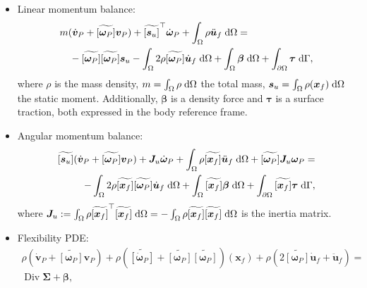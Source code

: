 \documentclass{svjour3}                     %
\DeclareMathOperator*{\Div}{Div}
\newcommand{\crmat}[1]{\ensuremath{\widetilde{\left[#1\right]}}}
\begin{document}
\begin{itemize}
	\item Linear momentum balance:
	\begin{equation}
	\label{eq:rig_tr1}
	\begin{split}
	&m (\dot{\bm{v}}_P + \crmat{\bm{\omega}_P} \bm{v}_P) + \crmat{\bm{s}_u}^\top \dot{\bm{\omega}}_P  + \int_{\Omega} \rho \ddot{\bm{u}}_f \d{\Omega} = \\
	&\quad - \crmat{\bm{\omega}_P} \crmat{\bm{\omega}_P} \bm{s}_u - \int_{\Omega} 2 \rho \crmat{\bm{\omega}_P} \dot{\bm{u}}_f \d{\Omega} +  \int_{\Omega} \bm\beta \d{\Omega} + \int_{\partial \Omega} \bm\tau \d{\Gamma},
	\end{split}
	\end{equation}
	where $\rho$ is the mass density, $m = \int_{\Omega} \rho \d{\Omega}$ the total mass,  $\bm{s}_u = \int_{\Omega} \rho (\bm{x}_f) \d{\Omega}$ the static moment. Additionally, $\bm\beta$ is a density force and $\bm\tau$ is a surface traction, both expressed in the body reference frame.
	\item Angular momentum balance:
	\begin{equation}
	\label{eq:rig_rot1}
	\begin{split}
	\crmat{\bm{s}_u} (\dot{\bm{v}}_P + \crmat{\bm{\omega}_P} \bm{v}_P) + \bm{J}_u \dot{\bm\omega}_P + \int_{\Omega} \rho \crmat{\bm{x}_f} \ddot{\bm{u}}_f \d{\Omega} + \crmat{\bm{\omega}_P} \bm{J}_u \bm{\omega}_P = \\ 
	- \int_{\Omega} 2\rho \crmat{\bm{x}_f} \crmat{\bm\omega_P} \dot{\bm{u}}_f \d{\Omega} + \int_{\Omega}\crmat{\bm{x}_f} \bm\beta \d{\Omega} + \int_{\partial \Omega}\crmat{\bm{x}_f} \bm\tau \d{\Gamma}, \\
	\end{split}
	\end{equation}
	where $\bm{J}_u:= \int_{\Omega} \rho \crmat{\bm{x}_f}^\top\crmat{\bm{x}_f} \d{\Omega}= - \int_{\Omega} \rho \crmat{\bm{x}_f}\crmat{\bm{x}_f} \d{\Omega}$ is the inertia matrix.
	\item Flexibility PDE:
	\begin{equation}
	\label{eq:flex1}
	\begin{split}
	\rho (\dot{\bm{v}}_P + \crmat{\bm\omega_P} \bm{v}_P) + \rho (\crmat{\dot{\bm\omega}_P} + \crmat{\bm{\omega}_P}\crmat{\bm{\omega}_P})(\bm{x}_f) + \rho (2 \crmat{\bm{\omega}_P} \dot{\bm{u}}_f + \ddot{\bm{u}}_f) = \\
	 \Div{\bm\Sigma} + \bm\beta,
		\end{split}
	\end{equation}

\end{itemize}
\end{document}
